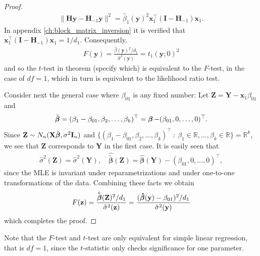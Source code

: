\begin{proof}
    \begin{align*}
        \|\textbf{H}\textbf{y} - \textbf{H}_{-1}\textbf{y}\|^2 = \hat{\beta}_1(\textbf{y})^2\textbf{x}_1^\top(\textbf{I} - \textbf{H}_{-1})\textbf{x}_1.
    \end{align*}
    In appendix \ref{ch:block_matrix_inversion} it is verified that $\textbf{x}_1^\top(\textbf{I} - \textbf{H}_{-1})\textbf{x}_1 = 1/d_1$.
    Consequently,
    \begin{align*}
        F(\textbf{y}) = \frac{\hat{\beta}(\textbf{y})^2/d_1}{\hat{\sigma}^2(\textbf{y})} = t_1(\textbf{y};0)^2
    \end{align*}
    and so the $t$-test in theorem (specify which) is equivalent to the $F$-test, in the case of $df=1$, which in turn is equivalent to the likelihood ratio test.
    
    Consider next the general case where $\beta_{01}$ is any fixed number: Let $\textbf{Z} = \textbf{Y} - \textbf{x}_1\beta_{01}$ and
    \begin{align*}
        \Tilde{\operatorname{\boldsymbol{\beta}}} = (\beta_1 - \beta_{01}, \beta_2, \ldots, \beta_k)^\top = \operatorname{\boldsymbol{\beta}} - (\beta_{01}, 0, \ldots, 0)^\top.
    \end{align*}
    Since $\textbf{Z} \sim N_n(\textbf{X}\Tilde{\boldsymbol{\beta}}, \sigma^2\textbf{I}_n)$ and $\{ (\beta_1 - \beta_{01}, \beta_2, \ldots, \beta_k)^\top \ : \ \beta_1 \in \mathbb{R}, \ldots, \beta_k \in \mathbb{R} \} = \mathbb{R}^k$, we see that $\textbf{Z}$ corresponds to $\textbf{Y}$ in the first case.
    It is easily seen that
    \begin{align*}
        \hat{\sigma}^2(\textbf{Z}) = \hat{\sigma}^2(\textbf{Y}), \quad \hat{\tilde{\boldsymbol{\beta}}}(\textbf{Z}) = \hat{\boldsymbol{\beta}}(\textbf{Y}) - (\beta_{01}, 0, \ldots, 0)^\top,
    \end{align*}
    since the MLE is invariant under reparametrizations and under one-to-one transformations of the data.
    Combining these facts we obtain
    \begin{align*}
        F(\textbf{z}) =
        \frac{\hat{\tilde{\boldsymbol{\beta}}}(\textbf{Z})^2/d_1}{\hat{\sigma}^2(\textbf{z})} = 
        \frac{(\operatorname{\boldsymbol{\hat{\beta}}}(\textbf{y}) - \beta_{01})^2/d_1}{\hat{\sigma}^2(\textbf{y})}
    \end{align*}
    which completes the proof.
\end{proof}

Note that the $F$-test and $t$-test are only equivalent for simple linear regression, that is $df = 1$, since the $t$-statistic only checks significance for one parameter.

